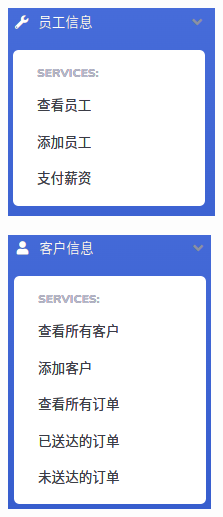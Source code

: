 \begin{figure}[H]
    \centering
    \begin{subfigure}{.25\textwidth}
        \centering
        \includegraphics[width=\textwidth]{figures/5employee.png}
        \label{fig:employee}
    \end{subfigure}
    \qquad
    \begin{subfigure}{.25\textwidth}
        \centering
        \includegraphics[width=\textwidth]{figures/5customer.png}

\end{subfigure}
\end{figure}
